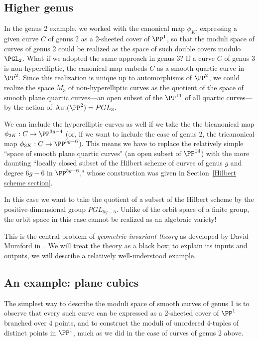 \subsection{Higher genus}

In the genus 2 example, we worked with the canonical map $\phi_K$, expressing a given curve $C$ of genus 2 as a 2-sheeted cover of $\PP^1$, so that the moduli space of curves of genus 2 could be realized as the space of such double covers modulo $\PGL_2$. What if we adopted the same approach in genus 3? If a curve $C$ of genus 3 is non-hyperelliptic, the canonical map embeds $C$ as a smooth quartic curve in $\PP^2$. Since this realization is unique up to automorphisms of $\PP^2$, we could realize the space $\tilde M_3$ of non-hyperelliptic curves as the quotient of the space of smooth plane quartic curves---an open subset of the $\PP^{14}$ of all quartic curves---by the action of ${\rm Aut}(\PP^2) = PGL_3$. 

We can include the hyperelliptic curves as well if we take the the bicanonical map $\phi_{2K} : C \to \PP^{3g-4}$ (or, if we want to include the case of genus 2, the tricanonical map  $\phi_{3K} : C \to \PP^{5g-6}$). This means we have to replace the relatively simple ``space of smooth plane quartic curves" (an open subset of $\PP^{14}$) with the more daunting ``locally closed subset of the Hilbert scheme of curves of genus $g$ and degree $6g-6$ in $\PP^{5g-6}$," whose construction was given in Section~\ref{Hilbert scheme section}.

In this case we want to take the quotient of a subset of the Hilbert scheme by the positive-dimensional group $PGL_{5g-5}$. Unlike of the orbit space of a finite group, the orbit space in this case cannot be realized as an algebraic variety!

This is the central problem of \emph{geometric invariant theory} as developed by David Mumford in~\cite{MumfordGIT}. We will treat the theory as a black box; to explain its inputs and outputs, we will describe a relatively well-understood example.

\subsection{An example: plane cubics}

The simplest way to describe the moduli space of smooth curves of genus 1 is to observe that every such curve can be expressed as a 2-sheeted cover of $\PP^1$ branched over 4 points, and to construct the moduli of unordered 4-tuples of distinct points in $\PP^1$, much as we did in the case of curves of genus 2 above.

